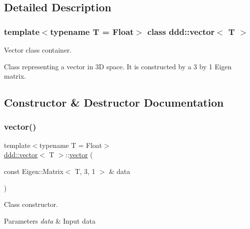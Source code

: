 \subsection{Detailed Description}
\subsubsection*{template$<$typename T = Float$>$\newline
class ddd\+::vector$<$ T $>$}

Vector class container. 

Class representing a vector in 3D space. It is constructed by a 3 by 1 Eigen matrix. 

\subsection{Constructor \& Destructor Documentation}
\mbox{\label{classddd_1_1vector_a5dec8f05a011372b6b2795827607e6b2}} 
\subsubsection{\texorpdfstring{vector()}{vector()}\hspace{0.1cm}{\footnotesize\ttfamily [1/3]}}
{\footnotesize\ttfamily template$<$typename T = Float$>$ \\
\hyperlink{classddd_1_1vector}{ddd\+::vector}$<$ T $>$\+::\hyperlink{classddd_1_1vector}{vector} (\begin{DoxyParamCaption}\item[{const Eigen\+::\+Matrix$<$ T, 3, 1 $>$ \&}]{data }\end{DoxyParamCaption})\hspace{0.3cm}{\ttfamily [inline]}}



Class constructor. 


\begin{DoxyParams}{Parameters}
{\em data} & Input data \\
\hline
\end{DoxyParams}
\mbox{\label{classddd_1_1vector_a90f097b576d026cb86b487546b841622}} 
